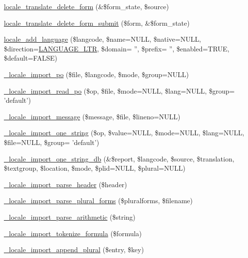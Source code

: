 \begin{CompactItemize}
\item 
\hyperlink{group__locale_g2e1074d7d1c8bf96ffa578da3f0e4979}{locale\_\-translate\_\-delete\_\-form} (\&\$form\_\-state, \$source)
\item 
\hyperlink{group__locale_g26d7aa049b06d9de384175698f5761c7}{locale\_\-translate\_\-delete\_\-form\_\-submit} (\$form, \&\$form\_\-state)
\item 
\hyperlink{group__locale_g9fc28b9f10f5aaa7cb733dc0145018a2}{locale\_\-add\_\-language} (\$langcode, \$name=NULL, \$native=NULL, \$direction=\hyperlink{bootstrap_8inc_8790965df4de009fe8bdcf17f6a5c738}{LANGUAGE\_\-LTR}, \$domain= '', \$prefix= '', \$enabled=TRUE, \$default=FALSE)
\item 
\hyperlink{group__locale_g5d3d163017bea9499839ef6be09807de}{\_\-locale\_\-import\_\-po} (\$file, \$langcode, \$mode, \$group=NULL)
\item 
\hyperlink{group__locale_g97099fd0b115843fd4d443686a3ca35d}{\_\-locale\_\-import\_\-read\_\-po} (\$op, \$file, \$mode=NULL, \$lang=NULL, \$group= 'default')
\item 
\hyperlink{group__locale_ga6bdc2dc6954e30cabefa65ca596e9d0}{\_\-locale\_\-import\_\-message} (\$message, \$file, \$lineno=NULL)
\item 
\hyperlink{group__locale_gc065dc774e2258493b661c45c455c709}{\_\-locale\_\-import\_\-one\_\-string} (\$op, \$value=NULL, \$mode=NULL, \$lang=NULL, \$file=NULL, \$group= 'default')
\item 
\hyperlink{group__locale_g9f159bc412475f146434c43b69d0ab89}{\_\-locale\_\-import\_\-one\_\-string\_\-db} (\&\$report, \$langcode, \$source, \$translation, \$textgroup, \$location, \$mode, \$plid=NULL, \$plural=NULL)
\item 
\hyperlink{group__locale_g1381fc54e922fe478d8ee5cfbe0c3c16}{\_\-locale\_\-import\_\-parse\_\-header} (\$header)
\item 
\hyperlink{group__locale_g0fedb2e69527b0887ce2e5742488d8c2}{\_\-locale\_\-import\_\-parse\_\-plural\_\-forms} (\$pluralforms, \$filename)
\item 
\hyperlink{group__locale_gfec8dc8c1a6f8a0c70b5280c3a520c63}{\_\-locale\_\-import\_\-parse\_\-arithmetic} (\$string)
\item 
\hyperlink{group__locale_g53c242ca7adfb5ccc25ebfedab8214a5}{\_\-locale\_\-import\_\-tokenize\_\-formula} (\$formula)
\item 
\hyperlink{group__locale_gd0abff75e696db162d5b90acda071371}{\_\-locale\_\-import\_\-append\_\-plural} (\$entry, \$key)
\item 

\end{CompactItemize}
